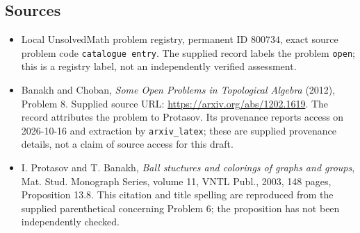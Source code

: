 \documentclass[11pt]{article}
\begin{document}
\subsection{Sources}
\begin{itemize}
\item Local UnsolvedMath problem registry, permanent ID \(800734\), exact source problem code \texttt{catalogue entry}. The supplied record labels the problem \texttt{open}; this is a registry label, not an independently verified assessment.
\item Banakh and Choban, \emph{Some Open Problems in Topological Algebra} (2012), Problem 8. Supplied source URL: \url{https://arxiv.org/abs/1202.1619}. The record attributes the problem to Protasov. Its provenance reports access on 2026-10-16 and extraction by \texttt{arxiv\_latex}; these are supplied provenance details, not a claim of source access for this draft.
\item I. Protasov and T. Banakh, \emph{Ball stuctures and colorings of graphs and groups}, Mat. Stud. Monograph Series, volume 11, VNTL Publ., 2003, 148 pages, Proposition 13.8. This citation and title spelling are reproduced from the supplied parenthetical concerning Problem 6; the proposition has not been independently checked.
\end{itemize}
\end{document}
